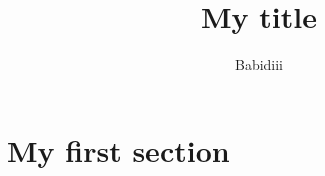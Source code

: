 \documentclass[12pt,french]{article}
\author{Babidiii}
\title{My title}
\begin{document}

\setcounter{page}{2}

% 
\tableofcontents \clearpage
\listoffigures \clearpage
\lstlistoflistings 
\listoftables \clearpage

\section{My first section}

% 
\clearpage
% 
\end{document}
